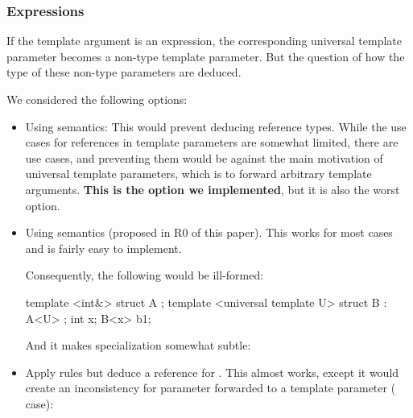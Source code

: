 \documentclass{wg21}
\begin{document}
\subsubsection{Expressions}

If the template argument is an expression, the corresponding universal template parameter becomes a non-type template parameter.
But the question of how the type of these non-type parameters are deduced.

We considered the following options:

\begin{itemize}
\item Using  semantics: This would prevent deducing reference types. While the use cases for references in template parameters are somewhat limited, there are use cases,
and preventing them would be against the main motivation of universal template parameters, which is to forward arbitrary template arguments.
\textbf{This is the option we implemented}, but it is also the worst option.

\item Using  semantics (proposed in R0 of this paper). This works for most cases and is fairly easy to implement.

Consequently, the following would be ill-formed:

\begin{colorblock}
template <int&> struct A { };
template <universal template U> struct B : A<U> { };
int x;
B<x> b1;
\end{colorblock}

And it makes specialization somewhat subtle:


\item Apply  rules but deduce a reference for .
This almost works, except it would create an inconsistency for parameter forwarded to a  template parameter ( case):


\end{itemize}
\end{document}
